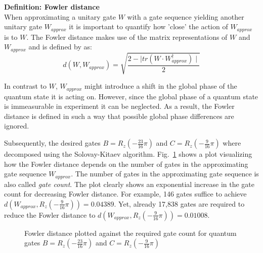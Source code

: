 
\begin{redbox}
\textbf{Definition: Fowler distance}\\
\newline
When approximating a unitary gate $W$ with a gate sequence yielding another unitary gate $W_{approx}$ it is important to quantify how 'close' the action of $W_{approx}$ is to $W$. The Fowler distance makes use of the matrix representations of $W$ and $W_{approx}$ and is defined by  as:
\begin{equation}
d(W,W_{approx}) = \sqrt{\frac{2-\mid tr(W\cdot W_{approx}^\dagger)\mid}{2}}
\end{equation}

In contrast to $W$, $W_{approx}$ might introduce a shift in the global phase of the quantum state it is acting on. However, since the global phase of a quantum state is immeasurable in experiment it can be neglected. As a result, the Fowler distance is defined in such a way that possible global phase differences are ignored.
\end{redbox}

Subsequently, the desired gates $B = R_z(-\frac{23}{16}\pi)$ and $C = R_z(-\frac{9}{16}\pi)$ where decomposed using the Solovay-Kitaev algorithm. Fig.~\ref{fig:skresultplot} shows a plot visualizing how the Fowler distance depends on the number of gates in the approximating gate sequence $W_{approx}$. The number of gates in the approximating gate sequence is also called \emph{gate count}. The plot clearly shows an exponential increase in the gate count for decreasing Fowler distance. For example, 146 gates suffice to achieve $d(W_{approx},R_z(-\frac{9}{16}\pi)) = 0.04389$. Yet, already 17,838 gates are required to reduce the Fowler distance to $d(W_{approx},R_z(-\frac{9}{16}\pi)) = 0.01008$.

\begin{figure}[H]
\centering
\caption{Fowler distance plotted against the required gate count for quantum gates $B = R_z(-\frac{23}{16}\pi)$ and $C = R_z(-\frac{9}{16}\pi)$ }
\label{fig:skresultplot}
  \end{figure}
  

